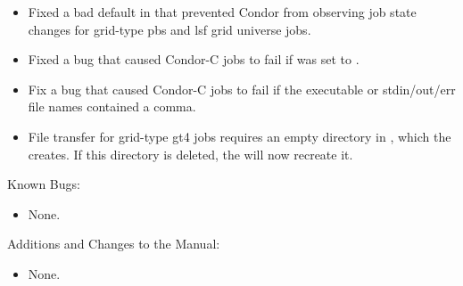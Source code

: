 \begin{itemize}
\item Fixed a bad default in  that prevented
Condor from observing job state changes for grid-type pbs and lsf grid
universe jobs.

\item Fixed a bug that caused Condor-C jobs to fail if
 was set to .

\item Fix a bug that caused Condor-C jobs to fail if the executable
or stdin/out/err file names contained a comma.

\item File transfer for grid-type gt4 jobs requires an empty directory
in , which the  creates. If this directory
is deleted, the  will now recreate it.

\end{itemize}

\noindent Known Bugs:

\begin{itemize}

\item None.

\end{itemize}

\noindent Additions and Changes to the Manual:

\begin{itemize}

\item None.

\end{itemize}

